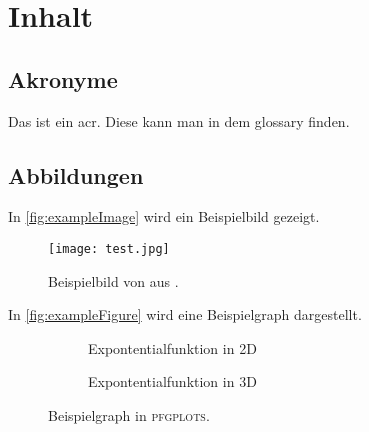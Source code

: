 \section{Inhalt}


\subsection{Akronyme}

Das ist ein \gls{acr}.
Diese kann man in dem \gls{glossary} finden.

\subsection{Abbildungen}

In \autoref{fig:exampleImage} wird ein Beispielbild gezeigt.

\begin{figure}[h]
    \centering
    \texttt{[image: test.jpg]}
    \caption[Beispielbild]{Beispielbild von \citeauthor{exampleImage} aus \autocite{exampleImage}.}
    \label{fig:exampleImage}
\end{figure}

In \autoref{fig:exampleFigure} wird eine Beispielgraph dargestellt.

\begin{figure}[h]
    \centering
    \begin{subfigure}{0.45\textwidth}
        \caption{Expontentialfunktion in 2D}
        \label{fig:2d-exp}
    \end{subfigure}
    \begin{subfigure}{0.45\textwidth}
        \caption{Expontentialfunktion in 3D}
        \label{fig:3d-exp}
    \end{subfigure}
    \caption[Beispielgraph]{Beispielgraph in \textsc{pfgplots}.}
    \label{fig:exampleFigure}
\end{figure}

